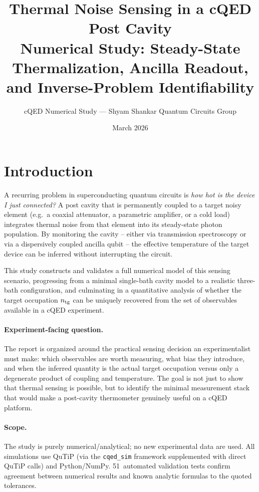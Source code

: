 \documentclass[11pt,a4paper]{article}
\title{\textbf{Thermal Noise Sensing in a cQED Post Cavity}\\[4pt]
       \large Numerical Study: Steady-State Thermalization, Ancilla Readout,
               and Inverse-Problem Identifiability}
\author{cQED Numerical Study --- Shyam Shankar Quantum Circuits Group}
\date{March 2026}
\newcommand{\ntg}{n_{\rm tg}}
\begin{document}
\maketitle
\tableofcontents
\bigskip

\section{Introduction}
\label{sec:intro}

A recurring problem in superconducting quantum circuits is
\emph{how hot is the device I just connected?}
A post cavity that is permanently coupled to a target noisy element
(e.g.\ a coaxial attenuator, a parametric amplifier, or a cold load)
integrates thermal noise from that element into its steady-state photon
population.  By monitoring the cavity -- either via transmission spectroscopy
or via a dispersively coupled ancilla qubit -- the effective temperature of the
target device can be inferred without interrupting the circuit.

This study constructs and validates a full numerical model of this sensing
scenario, progressing from a minimal single-bath cavity model to a realistic
three-bath configuration, and culminating in a quantitative analysis of whether
the target occupation $\ntg$ can be uniquely recovered from the set of
observables available in a cQED experiment.

\paragraph{Experiment-facing question.}
The report is organized around the practical sensing decision an experimentalist must make: which observables are worth measuring, what bias they introduce, and when the inferred quantity is the actual target occupation versus only a degenerate product of coupling and temperature. The goal is not just to show that thermal sensing is possible, but to identify the minimal measurement stack that would make a post-cavity thermometer genuinely useful on a cQED platform.

\paragraph{Scope.}
The study is purely numerical/analytical; no new experimental data are used.
All simulations use QuTiP (via the \texttt{cqed\_sim} framework supplemented
with direct QuTiP calls) and Python/NumPy.
51~automated validation tests confirm agreement between numerical results
and known analytic formulas to the quoted tolerances.
\end{document}
